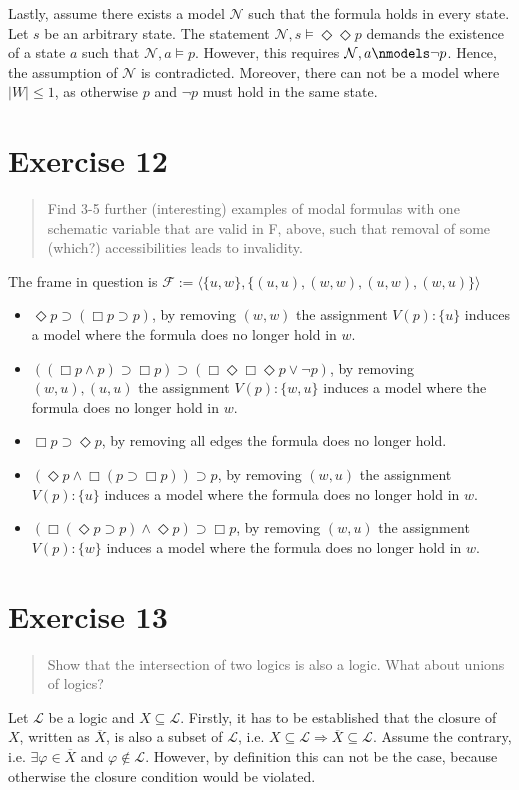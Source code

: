 \documentclass[11pt,a4paper]{article}
\newcommand{\lto}{\supset}
\newcommand{\some}{\Diamond}
\newcommand{\all}{\Box}
\newcommand{\sto}{\Rightarrow}
\begin{document}
\begin{itemize}
Lastly, assume there exists a model $\mathcal{N}$ such that the formula holds in every state. Let $s$ be an arbitrary state. The statement $\mathcal{N}, s \models \some \some p $ demands the existence of a state $a$ such that $\mathcal{N}, a \models p$. However, this requires  $\mathcal{N}, a \nmodels  \neg p$. Hence, the assumption of $\mathcal{N}$ is contradicted. Moreover, there can not be a model where $|W|\leq 1$, as otherwise $p$ and $\neg p$ must hold in the same state.

\end{itemize}


\section*{Exercise 12}
\begin{quote}
Find 3-5 further (interesting) examples of modal formulas with one schematic variable that are valid in F, above, such that removal of some (which?) accessibilities leads to invalidity.
\end{quote}
The frame in question is $\mathcal{F}:=\langle \{u,w\}, \{(u,u),(w,w),(u,w),(w,u)\}\rangle$
\begin{itemize}
\item $\some p \lto (\all p \lto p)$, by removing $(w,w)$ the assignment $V(p):\{u\}$ induces a model where the formula does no longer hold in $w$.

\item $((\all p \land p) \lto \all p) \lto (\all \some \all \some p \lor \neg p)$, by removing $(w,u), (u,u)$ the assignment $V(p):\{w, u\}$ induces a model where the formula does no longer hold in $w$.
\item $\all p \lto \some p$, by removing all edges the formula does no longer hold.
\item $(\some p \land \all(p \lto \all p)) \lto p$, by removing $(w,u)$ the assignment $V(p):\{u\}$ induces a model where the formula does no longer hold in $w$.
\item $(\all (\some p \lto p) \land \some p) \lto \all p$, by removing $(w,u)$ the assignment $V(p):\{w\}$ induces a model where the formula does no longer hold in $w$.
\end{itemize}



\section*{Exercise 13}
\begin{quote}
Show that the intersection of two logics is also a logic. What about unions of logics?
\end{quote}
Let $\mathcal{L}$ be a logic and $X \subseteq \mathcal{L}$. Firstly, it has to be established that the closure of $X$, written as $\overline{X}$, is also a subset of $\mathcal{L}$, i.e. $X \subseteq \mathcal{L} \sto \overline{X}\subseteq \mathcal{L}$. Assume the contrary, i.e. $\exists \varphi \in \overline{X}$ and $\varphi \notin \mathcal{L}$. However, by definition this can not be the case, because otherwise the closure condition would be violated.
\end{document}
